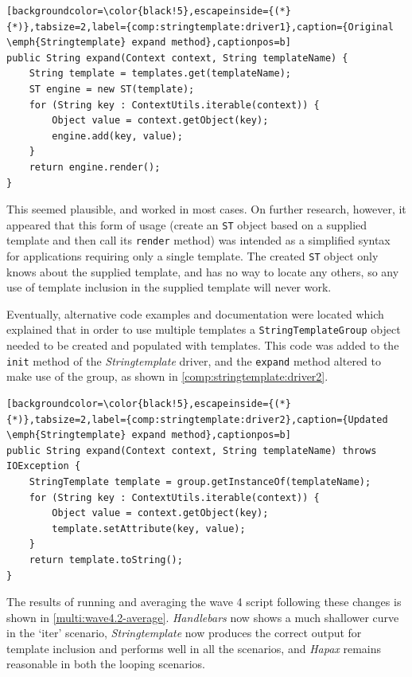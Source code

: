 \begin{lstlisting}[backgroundcolor=\color{black!5},escapeinside={(*}{*)},tabsize=2,label={comp:stringtemplate:driver1},caption={Original \emph{Stringtemplate} expand method},captionpos=b]
public String expand(Context context, String templateName) {
    String template = templates.get(templateName);
    ST engine = new ST(template);
    for (String key : ContextUtils.iterable(context)) {
        Object value = context.getObject(key);
        engine.add(key, value);
    }
    return engine.render();
}
\end{lstlisting}

This seemed plausible, and worked in most cases. On further research, however, it appeared that this form of usage (create an \verb!ST! object based on a supplied template and then call its \verb!render! method) was intended as a simplified syntax for applications requiring only a single template. The created \verb!ST! object only knows about the supplied template, and has no way to locate any others, so any use of template inclusion in the supplied template will never work.

Eventually, alternative code examples and documentation were located which explained that in order to use multiple templates a \verb!StringTemplateGroup! object needed to be created and populated with templates. This code was added to the \verb!init! method of the \emph{Stringtemplate} driver, and the \verb!expand! method altered to make use of the group, as shown in \autoref{comp:stringtemplate:driver2}.

\begin{lstlisting}[backgroundcolor=\color{black!5},escapeinside={(*}{*)},tabsize=2,label={comp:stringtemplate:driver2},caption={Updated \emph{Stringtemplate} expand method},captionpos=b]
public String expand(Context context, String templateName) throws IOException {
    StringTemplate template = group.getInstanceOf(templateName);
    for (String key : ContextUtils.iterable(context)) {
        Object value = context.getObject(key);
        template.setAttribute(key, value);
    }
    return template.toString();
}
\end{lstlisting}

The results of running and averaging the wave 4 script following these changes is shown in \autoref{multi:wave4.2-average}. \emph{Handlebars} now shows a much shallower curve in the `iter' scenario, \emph{Stringtemplate} now produces the correct output for template inclusion and performs well in all the scenarios, and \emph{Hapax} remains reasonable in both the looping scenarios.

